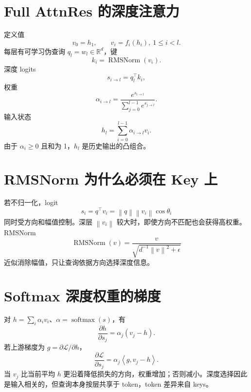 \documentclass[UTF8,12pt,a4paper,fontset=none]{ctexart}
\numberwithin{equation}{section}
\newcommand{\R}{\mathbb{R}}
\newcommand{\Loss}{\mathcal{L}}
\newcommand{\norm}[1]{\left\lVert #1\right\rVert}
\newcommand{\ip}[2]{\left\langle #1,#2\right\rangle}
\newcommand{\softmax}{\operatorname{softmax}}
\begin{document}
\section{Full AttnRes 的深度注意力}
定义值
\begin{equation}
 v_0=h_1,
 \qquad v_i=f_i(h_i),\ 1\le i<l.
\end{equation}
每层有可学习伪查询 $q_l=w_l\in\R^d$，键
\begin{equation}
 k_i=\operatorname{RMSNorm}(v_i).
\end{equation}
深度 logits
\begin{equation}
 s_{i\to l}=q_l^\top k_i,
\end{equation}
权重
\begin{equation}
 \boxed{\alpha_{i\to l}=
 \frac{e^{s_{i\to l}}}{\sum_{j=0}^{l-1}e^{s_{j\to l}}}}.
\end{equation}
输入状态
\begin{equation}
 \boxed{h_l=\sum_{i=0}^{l-1}\alpha_{i\to l}v_i}.
\end{equation}
由于 $\alpha_i\ge0$ 且和为 1，$h_l$ 是历史输出的凸组合。

\section{RMSNorm 为什么必须在 Key 上}
若不归一化，logit
\begin{equation}
 s_i=q^\top v_i=\norm{q}\norm{v_i}\cos\theta_i
\end{equation}
同时受方向和幅值控制。深层 $\norm{v_i}$ 较大时，即使方向不匹配也会获得高权重。RMSNorm
\begin{equation}
 \operatorname{RMSNorm}(v)=
 \frac{v}{\sqrt{d^{-1}\norm{v}^2+\epsilon}}
\end{equation}
近似消除幅值，只让查询依据方向选择深度信息。

\section{Softmax 深度权重的梯度}
对 $h=\sum_i\alpha_iv_i$、$\alpha=\softmax(s)$，有
\begin{equation}
 \frac{\partial h}{\partial s_j}=\alpha_j(v_j-h).
\end{equation}
若上游梯度为 $g=\partial\Loss/\partial h$，
\begin{equation}
 \boxed{
 \frac{\partial\Loss}{\partial s_j}
 =\alpha_j\ip{g}{v_j-h}}.
\end{equation}
当 $v_j$ 比当前平均 $h$ 更沿着降低损失的方向，权重增加；否则减小。深度选择因此是输入相关的，但查询本身按层共享于 token，token 差异来自 keys。
\end{document}
